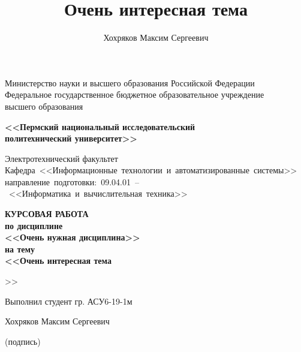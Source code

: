 \begin{titlepage}
\newcommand{\ctitle}[1]{#1\title{#1}}
\newcommand{\cauthor}[1]{#1\author{#1}}
\singlespacing

\begin{center}
	\small
	Министерство науки и высшего образования Российской Федерации\\
    Федеральное государственное бюджетное образовательное учреждение\\
    высшего образования\\
\end{center}

\begin{center}
	\bfseries
	<<Пермский национальный исследовательский\\
	политехнический университет>>
\end{center}

\begin{center}
    Электротехнический факультет\\
    \mbox{Кафедра <<Информационные технологии и автоматизированные системы>>}\\
    \mbox{направление подготовки: 09.04.01 -- <<Информатика и %
    вычислительная техника>>}
\end{center}

\vspace{3em}

\begin{center}
	\fontsize{16pt}{16pt}\selectfont\bfseries
	КУРСОВАЯ РАБОТА\\
	по дисциплине\\
	<<Очень нужная дисциплина>>\\
	на тему\\
	<<\ctitle{Очень интересная тема}>>
\end{center}

\vspace{2em}

\begin{center}
\hfill
\begin{minipage}{0.48\textwidth}
    Выполнил студент гр. АСУ6-19-1м

    \cauthor{Хохряков Максим Сергеевич}
    \vskip 1cm
    \underline{\hspace{\textwidth}}

    \centering\footnotesize
    (подпись)
    \end{minipage}
\end{center}


\end{titlepage}
